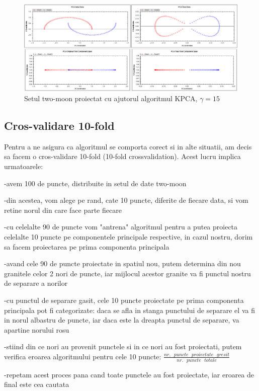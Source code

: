 \documentclass[12pt,oneside]{article}
\begin{document}
\begin{figure}[H]
\centering
\caption{Setul two-moon proiectat cu ajutorul algoritmul KPCA, $\gamma =15$}
\includegraphics[width=\linewidth]{twomoon1}
\end{figure}

\subsection{Cros-validare 10-fold}
Pentru a ne asigura ca algoritmul se comporta corect si in alte situatii, am decis sa facem o cros-validare 10-fold (10-fold crossvalidation). Acest lucru implica urmatoarele: 

-avem 100 de puncte, distribuite in setul de date two-moon

-din acestea, vom alege pe rand, cate 10 puncte, diferite de fiecare data, si vom retine norul din care face parte fiecare

-cu celelalte 90 de puncte vom "antrena" algoritmul pentru a putea proiecta celelalte 10 puncte pe componentele principale respective, in cazul nostru, dorim sa facem proiectarea pe prima componenta principala

-avand cele 90 de puncte proiectate in spatiul nou, putem determina din nou granitele celor 2 nori de puncte, iar mijlocul acestor granite va fi punctul nostru de separare a norilor

-cu punctul de separare gasit, cele 10 puncte proiectate pe prima componenta principala pot fi categorizate: daca se afla in stanga punctului de separare el va fi in norul albastru de puncte, iar daca este la dreapta punctul de separare, va apartine norului rosu

-stiind din ce nori au provenit punctele si in ce nori au fost proiectati, putem verifica eroarea algoritmului pentru cele 10 puncte: $\frac{nr. \text { } puncte \text { } proiectate \text { } gresit}{nr. \text { } puncte \text { } totale}$

-repetam acest proces pana cand toate punctele au fost proiectate, iar eroarea de final este cea cautata
\end{document}
